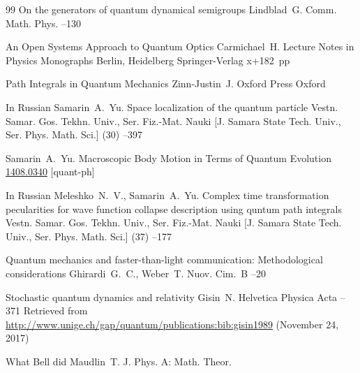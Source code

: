 \begin{thebibliography}{99}
\paper On the generators of quantum dynamical semigroups
\by Lindblad~G.
\jour Comm. Math. Phys. 
--130

\book An Open Systems Approach to Quantum Optics
\by Carmichael~H.
\serial Lecture Notes in Physics Monographs
\publaddr Berlin, Heidelberg
\publ Springer-Verlag 
\totalpages x+182~pp \nofrills
{}

\book Path Integrals in Quantum Mechanics
\by Zinn-Justin~J.
\publ Oxford Press
\publaddr Oxford

\lang In Russian
\by Samarin~A.~Yu.
\paper Space localization of the quantum particle
\jour Vestn. Samar. Gos. Tekhn. Univ., Ser. Fiz.-Mat. Nauki \rm [J. Samara State Tech. Univ., Ser. Phys. Math. Sci.]
(30)
--397

\by Samarin~A.~Yu.
\preprint Macroscopic Body Motion in Terms of Quantum Evolution
\arxiv \href{http://arxiv.org/abs/1408.0340}{1408.0340} [quant-ph]

\lang In Russian
\by Meleshko~N.~V., Samarin~A.~Yu.
\paper Complex time transformation pecularities for wave function collapse description using quntum path integrals
\jour Vestn. Samar. Gos. Tekhn. Univ., Ser. Fiz.-Mat. Nauki \rm [J. Samara State Tech. Univ., Ser. Phys. Math. Sci.]
(37)
--177


\paper Quantum mechanics and faster-than-light communication: Methodological considerations
\by Ghirardi~G.~C., Weber~T.
\jour Nuov. Cim.~B
--20

\paper Stochastic quantum dynamics and relativity
\by Gisin~N.
\jour Helvetica Physica Acta
--371
\elink Retrieved from  \url{http://www.unige.ch/gap/quantum/publications:bib:gisin1989} (November 24, 2017)

\paper What Bell did
\by Maudlin~T.
\jour J. Phys. A: Math. Theor.


\end{thebibliography}
